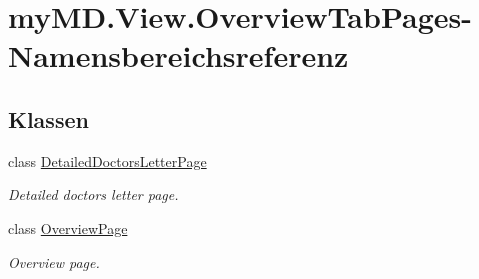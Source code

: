 \hypertarget{namespacemy_m_d_1_1_view_1_1_overview_tab_pages}{}\section{my\+M\+D.\+View.\+Overview\+Tab\+Pages-\/\+Namensbereichsreferenz}
\label{namespacemy_m_d_1_1_view_1_1_overview_tab_pages}
\subsection*{Klassen}
\begin{DoxyCompactItemize}
\item 
class \mbox{\hyperlink{classmy_m_d_1_1_view_1_1_overview_tab_pages_1_1_detailed_doctors_letter_page}{Detailed\+Doctors\+Letter\+Page}}
\begin{DoxyCompactList}\small\item\em Detailed doctors letter page. \end{DoxyCompactList}\item 
class \mbox{\hyperlink{classmy_m_d_1_1_view_1_1_overview_tab_pages_1_1_overview_page}{Overview\+Page}}
\begin{DoxyCompactList}\small\item\em Overview page. \end{DoxyCompactList}\end{DoxyCompactItemize}
